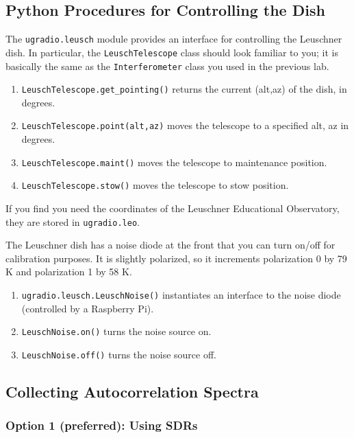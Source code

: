 \documentclass[psfig,preprint]{aastex}
\begin{document}
\subsection{Python Procedures for Controlling the Dish}

\noindent
The {\tt ugradio.leusch} module provides an interface for controlling
the Leuschner dish.  In particular, the {\tt LeuschTelescope} class should
look familiar to you; it is basically the same as the {\tt Interferometer}
class you used in the previous lab.

\begin{enumerate}
\item {\tt LeuschTelescope.get\_pointing()} returns the current (alt,az) of the dish, in degrees.
\item {\tt LeuschTelescope.point(alt,az)} moves the telescope to a specified alt, az in degrees.
\item {\tt LeuschTelescope.maint()} moves the telescope to maintenance position.
\item {\tt LeuschTelescope.stow()} moves the telescope to stow position.
\end{enumerate}

\noindent
If you find you need the coordinates of the Leuschner Educational Observatory, they are stored in
{\tt ugradio.leo}.

The Leuschner dish has a noise diode at the front that you can turn on/off for
calibration purposes. It is slightly polarized, so it increments 
polarization 0 by 79 K and polarization 1 by 58 K.
\begin{enumerate}
\item {\tt ugradio.leusch.LeuschNoise()} instantiates an interface to the noise diode (controlled
by a Raspberry Pi).
\item {\tt LeuschNoise.on()} turns the noise source on.
\item {\tt LeuschNoise.off()} turns the noise source off.
\end{enumerate}

\subsection{Collecting Autocorrelation Spectra}

\subsubsection{Option 1 (preferred): Using SDRs}
\end{document}
